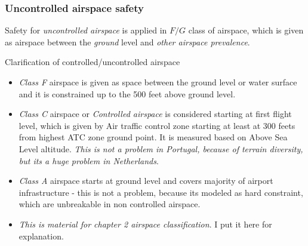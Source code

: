 \subsubsection{Uncontrolled airspace safety}
\noindent Safety for \emph{uncontrolled airspace} is applied in $F/G$ class of airspace, which is given as airspace between the \emph{ground} level and \emph{other airspace prevalence}.
\begin{note}{Clarification of controlled/uncontrolled airspace}
    \begin{itemize}
        \item \emph{Class F} airspace is given as space between the ground level or water surface and it is constrained up to the 500 feet above ground level.
        \item \emph{Class C} airspace or \emph{Controlled airspace} is considered starting at first flight level, which is given by Air traffic control zone starting at least at 300 feets from highest ATC zone ground point. It is measured based on Above Sea Level altitude. \emph{This is not a problem in Portugal, because of terrain diversity, but its a huge problem in Netherlands}.
        \item \emph{Class A} airspace starts at ground level and covers majority of airport infrastructure - this is not a problem, because its modeled as hard constraint, which are unbreakable in non controlled airspace.
        \item \emph{This is material for chapter 2 airspace classification}. I put it here for explanation. 
    \end{itemize}
\end{note}

